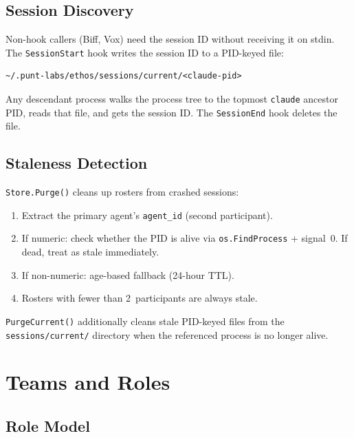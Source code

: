 \documentclass[a4paper,10pt]{article}
\newcommand{\field}[1]{\texttt{#1}}
\newcommand{\fpath}[1]{\texttt{#1}}
\begin{document}
\subsection{Session Discovery}

Non-hook callers (Biff, Vox) need the session ID without receiving it
on stdin.  The \texttt{SessionStart} hook writes the session ID to a
PID-keyed file:

\begin{verbatim}
~/.punt-labs/ethos/sessions/current/<claude-pid>
\end{verbatim}

Any descendant process walks the process tree to the topmost
\texttt{claude} ancestor PID, reads that file, and gets the session
ID.  The \texttt{SessionEnd} hook deletes the file.

\subsection{Staleness Detection}

\texttt{Store.Purge()} cleans up rosters from crashed sessions:

\begin{enumerate}
  \item Extract the primary agent's \field{agent\_id} (second
    participant).
  \item If numeric: check whether the PID is alive via
    \texttt{os.FindProcess} + signal~0.  If dead, treat as stale
    immediately.
  \item If non-numeric: age-based fallback (24-hour TTL).
  \item Rosters with fewer than 2~participants are always stale.
\end{enumerate}

\texttt{PurgeCurrent()} additionally cleans stale PID-keyed files
from the \fpath{sessions/current/} directory when the referenced
process is no longer alive.

\section{Teams and Roles}

\subsection{Role Model}
\end{document}
